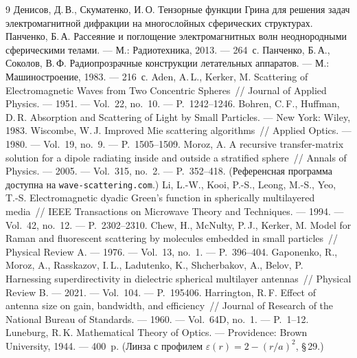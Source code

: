 \documentclass[11pt,a4paper]{article}
\begin{document}
\begin{thebibliography}{9}
  Денисов, Д.\,В., Скуматенко, И.\,О. Тензорные функции Грина для решения задач
  электромагнитной дифракции на многослойных сферических структурах.
  Панченко, Б.\,А. Рассеяние и поглощение электромагнитных волн неоднородными
  сферическими телами. --- М.: Радиотехника, 2013. --- 264~с.
  Панченко, Б.\,А., Соколов, В.\,Ф. Радиопрозрачные конструкции летательных
  аппаратов. --- М.: Машиностроение, 1983. --- 216~с.
  Aden, A.\,L., Kerker, M. Scattering of Electromagnetic Waves from Two Concentric
  Spheres~// Journal of Applied Physics. --- 1951. --- Vol.~22, no.~10. ---
  P.~1242--1246.
  Bohren, C.\,F., Huffman, D.\,R. Absorption and Scattering of Light by Small
  Particles. --- New York: Wiley, 1983.
  Wiscombe, W.\,J. Improved Mie scattering algorithms~// Applied Optics. --- 1980.
  --- Vol.~19, no.~9. --- P.~1505--1509.
  Moroz, A. A recursive transfer-matrix solution for a dipole radiating inside and
  outside a stratified sphere~// Annals of Physics. --- 2005. --- Vol.~315, no.~2.
  --- P.~352--418. (Референсная программа доступна на
  \texttt{wave-scattering.com}.)
  Li, L.-W., Kooi, P.-S., Leong, M.-S., Yeo, T.-S. Electromagnetic dyadic Green's
  function in spherically multilayered media~// IEEE Transactions on Microwave
  Theory and Techniques. --- 1994. --- Vol.~42, no.~12. --- P.~2302--2310.
  Chew, H., McNulty, P.\,J., Kerker, M. Model for Raman and fluorescent scattering
  by molecules embedded in small particles~// Physical Review A. --- 1976. ---
  Vol.~13, no.~1. --- P.~396--404.
  Gaponenko, R., Moroz, A., Rasskazov, I.\,L., Ladutenko, K., Shcherbakov, A.,
  Belov, P. Harnessing superdirectivity in dielectric spherical multilayer
  antennas~// Physical Review B. --- 2021. --- Vol.~104. --- P.~195406.
  Harrington, R.\,F. Effect of antenna size on gain, bandwidth, and efficiency~//
  Journal of Research of the National Bureau of Standards. --- 1960. ---
  Vol.~64D, no.~1. --- P.~1--12.
  Luneburg, R.\,K. Mathematical Theory of Optics. --- Providence: Brown University,
  1944. --- 400~p. (Линза с профилем $\varepsilon(r) = 2 - (r/a)^2$, \S\,29.)
\end{thebibliography}
\end{document}
